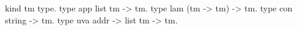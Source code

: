 \begin{elpicode}
  kind tm  type.
  type app list tm -> tm.
  type lam (tm -> tm) -> tm.
  type con string -> tm.
  type uva addr -> list tm -> tm.
\end{elpicode}
